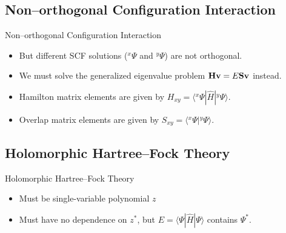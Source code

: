 \documentclass{beamer}
\newcommand{\braket}[3] {{\langle #1 | #2 | #3 \rangle}}
\newcommand{\brket}[2] {{\langle #1 | #2  \rangle}}
\newcommand{\up}[2] {{^{#1}\!#2}}
\begin{document}
\subsection{Non--orthogonal Configuration Interaction}
\begin{frame}{Non--orthogonal Configuration Interaction}
 \begin{itemize}
  \item<2-> But different SCF solutions ($\up{x}{\Psi}$ and $\up{y}{\Psi}$) are \alert{not orthogonal}.
  \item<3-> We must solve the generalized eigenvalue problem ${\bf H v}=E{\bf S v}$ instead.
  \item<4-> Hamilton matrix elements are given by $H_{xy}=\braket{\up{x}\Psi}{\hat H}{\up y\Psi}$.
  \item<5-> Overlap matrix elements are given by $S_{xy}=\brket{\up{x}\Psi}{\up y\Psi}$.
 \end{itemize}
\vspace{1em}
\vfill
\vspace{2em}
\end{frame}

\subsection{Holomorphic Hartree--Fock Theory}
\begin{frame}{Holomorphic Hartree--Fock Theory}
 \begin{itemize}
  \item<2->{Must be single-variable polynomial $z$}
  \item<3->{Must have no dependence on $z^*$, but $E=\braket{\Psi}{\hat H}{\Psi}$ contains $\Psi^*$.}
 \end{itemize}
\end{frame}
\end{document}
